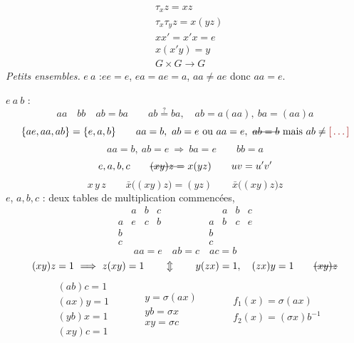 \documentclass[11pt,a4paper]{article}
\begin{document}
\[
  \begin{aligned}
    &\tau_xz=xz\\ &\tau_x\tau_yz=x(yz)\\ &xx'=x'x=e\\ &x(x'y)=y\\ &G\times G\to G
  \end{aligned}
\]
\emph{Petits ensembles.} $e\ a$ :\quad $ee=e$, $ea=ae=a$, $aa\neq ae$ donc $aa=e$.

$e\ a\ b$ :
\[
  aa\quad bb\quad ab=ba \qquad ab\overset{?}{=}ba,\quad ab=a(aa),\ ba=(aa)a
\]
\[
  \{ae,aa,ab\}=\{e,a,b\}\qquad aa=b,\ ab=e\ \text{ou}\ aa=e,\ \text{\struck{$ab=b$}}\ \text{mais}\ ab\neq\ill{}
\]
\[
  aa=b,\ ab=e\ \Longrightarrow\ \boxed{ba=e}\qquad bb=a
\]
\[
  e,a,b,c \qquad \text{\struck{$(xy)z=$}}\ x(yz)\qquad uv=u'v'
\]
\[
  x\,y\,z\qquad \bar x\bigl((xy)z\bigr)=(yz)\qquad \bar x\bigl((xy)z\bigr)z
\]
$e$, $a,b,c$ : deux tables de multiplication commencées,
\[
  \begin{array}{c|ccc}
    & a & b & c\\ \hline
    a & e & c & b\\ b & & & \\ c & & &
  \end{array}
  \qquad\qquad
  \begin{array}{c|ccc}
    & a & b & c\\ \hline
    a & b & c & e\\ b & & & \\ c & & &
  \end{array}
\]
\[
  aa=e\quad ab=c\quad ac=b
\]
\[
  (xy)z=1\ \Longrightarrow\ z(xy)=1\qquad \Updownarrow\qquad y(zx)=1,\quad (zx)y=1\qquad \text{\struck{$(xy)z$}}
\]
\[
  \begin{aligned}
    &(ab)c=1\\ &(ax)y=1\\ &(yb)x=1\\ &(xy)c=1
  \end{aligned}
  \qquad
  \begin{aligned}
    &y=\sigma(ax)\\ &yb=\sigma x\\ &xy=\sigma c
  \end{aligned}
  \qquad
  \begin{aligned}
    &f_1(x)=\sigma(ax)\\ &f_2(x)=(\sigma x)b^{-1}
  \end{aligned}
\]
\end{document}
